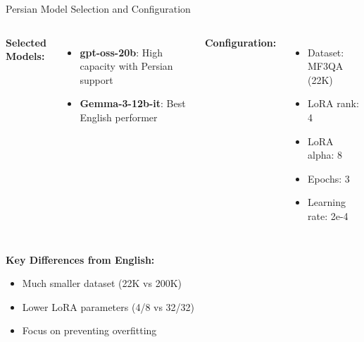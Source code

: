 \begin{frame}{Persian Model Selection and Configuration}
    \begin{columns}[T]
        \textbf{Selected Models:}
        \begin{itemize}
            \item \textbf{gpt-oss-20b}: High capacity with Persian support
            \item \textbf{Gemma-3-12b-it}: Best English performer
        \end{itemize}
        
        \textbf{Configuration:}
        \begin{itemize}
            \item Dataset: MF3QA (22K)
            \item LoRA rank: 4
            \item LoRA alpha: 8
            \item Epochs: 3
            \item Learning rate: 2e-4
        \end{itemize}
    \end{columns}
    
    \vspace{0.5em}
    
    \textbf{Key Differences from English:}
    \begin{itemize}
        \item Much smaller dataset (22K vs 200K)
        \item Lower LoRA parameters (4/8 vs 32/32)
        \item Focus on preventing overfitting
    \end{itemize}
\end{frame}

